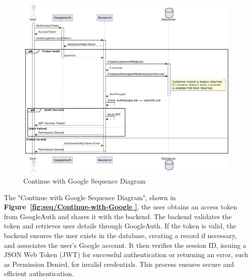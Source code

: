 \begin{figure}[!h]
  \centering
  \includegraphics[width=\textwidth]{images/docs/diagrams/sequence-diagrams/all-sequence-diagrams/Continue with Google.png}
  \caption{Continue with Google Sequence Diagram}
  \label{fig:seq/continue-with-google}
\end{figure}

The "Continue with Google Sequence Diagram", shown in \textbf{Figure~\ref{fig:seq/Continue-with-Google }}, the user obtains an access token from GoogleAuth and shares it with the backend. The backend validates the token and retrieves user details through GoogleAuth. If the token is valid, the backend ensures the user exists in the database, creating a record if necessary, and associates the user’s Google account. It then verifies the session ID, issuing a JSON Web Token (JWT) for successful authentication or returning an error, such as Permission Denied, for invalid credentials. This process ensures secure and efficient authentication.